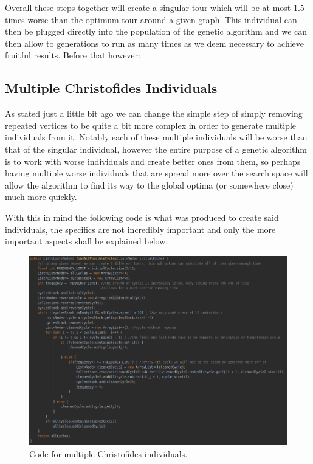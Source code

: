 \documentclass[11pt,a4paper,titlepage]{article}
\begin{document}
Overall these steps together will create a singular tour which will be at most 1.5 times worse than the optimum tour around a given graph. This individual can then be plugged directly into the population of the genetic algorithm and we can then allow to generations to run as many times as we deem necessary to achieve fruitful results. Before that however:

\subsection{Multiple Christofides Individuals}
As stated just a little bit ago we can change the simple step of simply removing repeated vertices to be quite a bit more complex in order to generate multiple individuals from it. Notably each of these multiple individuals will be worse than that of the singular individual, however the entire purpose of a genetic algorithm is to work with worse individuals and create better ones from them, so perhaps having multiple worse individuals that are spread more over the search space will allow the algorithm to find its way to the global optima (or somewhere close) much more quickly.

With this in mind the following code is what was produced to create said individuals, the specifics are not incredibly important and only the more important aspects shall be explained below.

\begin{figure}[ht]
	\includegraphics[scale=0.45]{MultiChrisAlg}
	\centering
	\caption{Code for multiple Christofides individuals.}
\end{figure}
\end{document}
